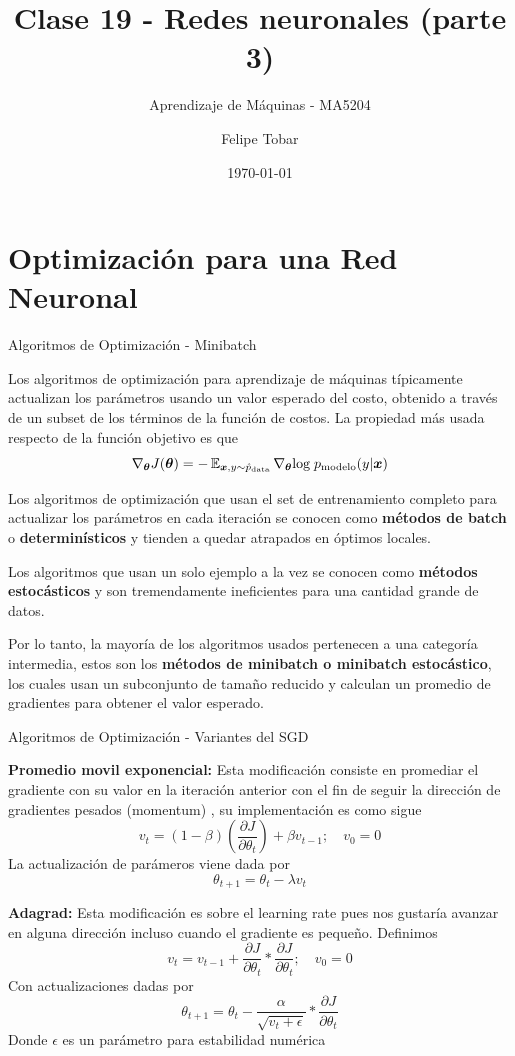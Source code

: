 \documentclass[9pt]{beamer}
\title{Clase 19 - Redes neuronales (parte 3)}
\subtitle{Aprendizaje de Máquinas - MA5204}
\date{\today}
\author{Felipe Tobar}
\institute{Department of Mathematical Engineering \&\\ Center for Mathematical Modelling\\Universidad de Chile}
\begin{document}
\begin{frame}
  \titlepage
\end{frame}

\section{Optimización para una Red Neuronal}
\begin{frame}{Algoritmos de Optimización - Minibatch}

Los algoritmos de optimización para aprendizaje de máquinas típicamente actualizan los parámetros usando un valor esperado del costo, obtenido a través de un subset de los términos de la función de costos. La propiedad más usada respecto de la función objetivo es que \pause
\begin{equation*}
\nabla_{\bm{\theta}}J(\bm{\theta}) = -\operatorname{\mathbb{E}}_{\bm{x},y\sim \hat{p}_{\textrm{data}}}\nabla_{\bm{\theta}}\textrm{log}\; p_{\textrm{modelo}}(y|\bm{x})
\end{equation*} \pause

Los algoritmos de optimización que usan el set de entrenamiento completo para actualizar los parámetros en cada iteración se conocen como \textbf{métodos de batch} o \textbf{determinísticos} y tienden a quedar atrapados en óptimos locales. \\ \pause 

Los algoritmos que usan un solo ejemplo a la vez se conocen como \textbf{métodos estocásticos} y son tremendamente ineficientes para una cantidad grande de datos. \pause 

Por lo tanto, la mayoría de los algoritmos usados pertenecen a una categoría intermedia, estos son los \textbf{métodos de minibatch o minibatch estocástico}, los cuales usan un subconjunto de tamaño reducido y calculan un promedio de gradientes para obtener el valor esperado.


\end{frame}

\begin{frame}{Algoritmos de Optimización - Variantes del SGD}

\textbf{Promedio movil exponencial: } Esta modificación consiste en promediar el gradiente con su valor en la iteración anterior con el fin de seguir la dirección de gradientes pesados (momentum) , su implementación es como sigue \pause
\[
v_t = (1-\beta) \left ( \frac{\partial J}{\partial \theta_t} \right ) + \beta v_{t-1};  \quad v_0 = 0
\] \pause
La actualización de parámeros viene dada por 
\[
\theta_{t+1} = \theta_t - \lambda v_t
\] \pause 

\textbf{Adagrad: } Esta modificación es sobre el learning rate pues nos gustaría avanzar en alguna dirección incluso cuando el gradiente es pequeño. Definimos \pause
\[
v_{t} = v_{t-1} +  \frac{\partial J}{\partial \theta_t} * \frac{\partial J}{\partial \theta_t} ; \quad v_0 = 0
\] 
Con actualizaciones dadas por \pause
\[
\theta_{t+1} = \theta_t - \frac{\alpha}{\sqrt{v_t + \epsilon}} * \frac{\partial J}{\partial \theta_t}
\]
Donde $\epsilon$ es un parámetro para estabilidad numérica

\end{frame}
\end{document}

